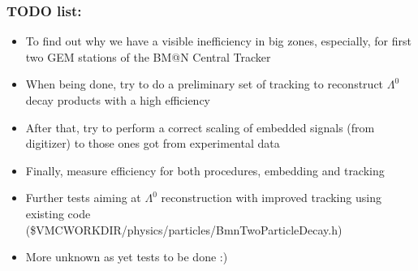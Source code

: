 \documentclass[dvipsnames] {beamer}
\begin{document}
           \begin{frame}
             \frametitle{\bf \centering TODO list:}
             \bf
             \begin{itemize}
             \item {\color{red} To find out why we have a visible inefficiency in big zones, especially, for first two GEM stations of the BM@N Central Tracker}
             \item When being done, try to do a preliminary set of tracking to reconstruct $\Lambda^{0}$ decay products with a high efficiency
             \item After that, try to perform a correct scaling of embedded signals (from digitizer) to those ones got from experimental data
             \item Finally, measure efficiency for both procedures, embedding and tracking
             \item Further tests aiming at $\Lambda^{0}$ reconstruction with improved tracking using existing code \\
               {(\scriptsize \$VMCWORKDIR/physics/particles/BmnTwoParticleDecay.h})
             \item More unknown as yet tests to be done :)
               
               
             \end{itemize}
           \end{frame}
         
      
      
      
\end{document}

